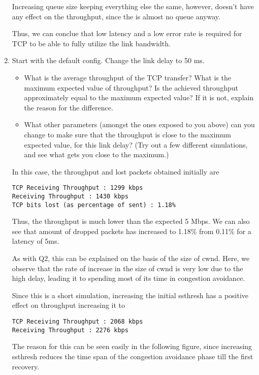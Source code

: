 \documentclass[a4paper]{article}
\begin{document}
\begin{enumerate}
Increasing queue size keeping everything else the same, however, doesn't have any effect on the throughput, since the is almost no queue anyway.

Thus, we can conclue that low latency and a low error rate is required for TCP to be able to fully utilize the link bandwidth.

\item Start with the default config. Change the link delay to 50 ms. 
\begin{itemize}
	\item What is the average throughput of the TCP transfer? What is the maximum expected value of throughput? Is the achieved throughput approximately equal to the maximum expected value? If it is not, explain the reason for the difference. 
	\item What other parameters (amongst the ones exposed to you above) can you change to make sure that the throughput is close to the maximum expected value, for this link delay? (Try out a few different simulations, and see what gets you close to the maximum.) 
\end{itemize}

In this case, the throughput and lost packets obtained initially are
\begin{verbatim}
TCP Receiving Throughput : 1299 kbps
Receiving Throughput : 1430 kbps
TCP bits lost (as percentage of sent) : 1.18%
\end{verbatim}
Thus, the throughput is much lower than the expected 5 Mbps. We can also see that amount of dropped packets has increased to 1.18\% from 0.11\% for a latency of 5ms.

As with Q2, this can be explained on the basis of the size of cwnd. Here, we observe that the rate of increase in the size of cwnd is very low due to the high delay, leading it to spending most of its time in congestion avoidance.
\begin{center}\end{center}

Since this is a short simulation, increasing the initial ssthresh has a positive effect on throughput increasing it to
\begin{verbatim}
TCP Receiving Throughput : 2068 kbps
Receiving Throughput : 2276 kbps
\end{verbatim}
The reason for this can be seen easily in the following figure, since increasing ssthresh reduces the time span of the congestion avoidance phase till the first recovery.
\begin{center}\end{center}


\end{enumerate}
\end{document}
